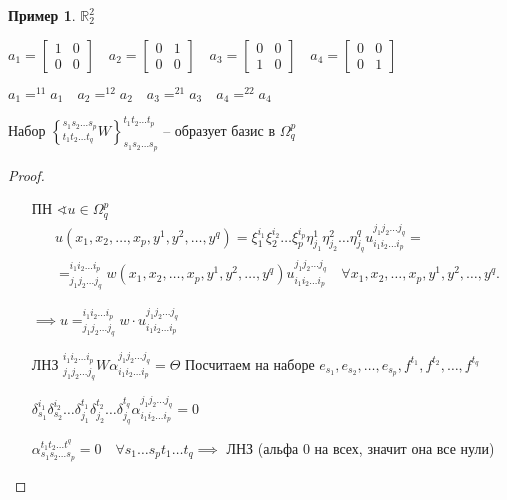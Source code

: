 \documentclass{book}
\newcommand\R{\ensuremath{\mathbb{R}}}
\theoremstyle{definition}
\newtheorem*{example}{Пример}
\begin{document}
    \begin{example}
        $\R_2^2$ 
        
        $a_1 = \begin{bmatrix} 1&0\\0&0 \end{bmatrix} \quad a_2 = \begin{bmatrix} 0&1\\0&0 \end{bmatrix} \quad a_3 = \begin{bmatrix} 0&0\\1&0 \end{bmatrix} \quad a_4 = \begin{bmatrix} 0&0\\0&1 \end{bmatrix} $

        $a_1 = ^{11}a_1\quad a_2 = ^{12}a_2\quad a_3 = ^{21}a_3\quad a_4 = ^{22}a_4$
    \end{example}

    \begin{theorem}
        Набор $\left\{ _{t_1 t_2 \ldots t_q}^{s_1 s_2 \ldots s_p} W \right\} _{s_1 s_2 \ldots s_p}^{t_1t_2 \ldots t_p} $ -- образует базис в $\Omega_q^p$
    \end{theorem}
    \begin{proof}
        \begin{itemize}
            \item []
            \item [ПН] $\sphericalangle u\in \Omega_q^p$
                \begin{align*}
                    &u\left( x_1, x_2, \ldots, x_p, y^1, y^2, \ldots, y^q \right)  = \xi_1^{i_1}\xi_2^{i_2}\ldots\xi_p^{i_p}\eta_{j_1}^1\eta_{j_2}^2\ldots\eta_{j_q}^qu_{i_1 i_2 \ldots i_p}^{j_1 j_2 \ldots j_q}=\\
                    &= _{j_1 j_2 \ldots j_q}^{i_1 i_2 \ldots i_p}w\left( x_1, x_2, \ldots, x_p, y^1, y^2, \ldots, y^q  \right) u_{i_1 i_2 \ldots i_p}^{j_1 j_2 \ldots j_q}\quad \forall x_1, x_2, \ldots, x_p, y^1, y^2, \ldots, y^q
                .\end{align*}

                $\implies u = _{j_1 j_2 \ldots j_q}^{i_1 i_2 \ldots i_p}w\cdot u_{i_1 i_2 \ldots i_p}^{j_1 j_2 \ldots j_q}$

            \item [ЛНЗ] $_{j_1 j_2 \ldots j_q}^{i_1 i_2 \ldots i_p}W\alpha_{i_1 i_2 \ldots i_p}^{j_1 j_2 \ldots j_q} = \Theta$ Посчитаем на наборе $e_{s_1}, e_{s_2}, \ldots, e_{s_p}, f^{t_1}, f^{t_2}, \ldots, f^{t_q}$

                $\delta_{s_1}^{i_1}\delta_{s_2}^{i_2}\ldots\delta_{j_1}^{t_1}\delta_{j_2}^{t_2}\ldots\delta_{j_q}^{t_q}\alpha_{i_1 i_2 \ldots i_p}^{j_1 j_2 \ldots j_q} = 0$

                $\alpha_{s_1 s_2 \ldots s_p}^{t_1 t_2 \ldots t^q} = 0\quad \forall s_1 \ldots s_p t_1 \ldots t_q \implies $ ЛНЗ (альфа 0 на всех, значит она все нули)
        \end{itemize}
    \end{proof}
\end{document}

